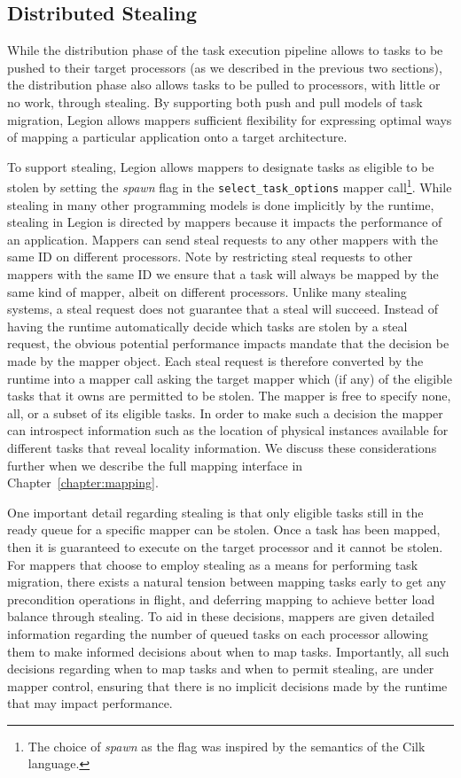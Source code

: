 \subsection{Distributed Stealing}
\label{subsec:stealdist}
While the distribution phase of the task
execution pipeline allows to tasks to be
pushed to their target processors (as 
we described in the previous two sections),
the distribution phase also allows tasks 
to be pulled to processors, with little or
no work, through stealing. By supporting both
push and pull models of task migration, 
Legion allows mappers sufficient flexibility
for expressing optimal ways of mapping a
particular application onto a target
architecture.

To support stealing, Legion allows mappers
to designate tasks as eligible to be
stolen by setting the {\em spawn} flag
in the {\tt select\_task\_options} mapper
call\footnote{The choice of {\em spawn} as the flag
was inspired by the semantics of the Cilk
language\cite{Cilk98}.}. While stealing in many
other programming models is done implicitly by
the runtime, stealing in Legion is directed by 
mappers because it impacts the performance 
of an application. Mappers can send steal requests 
to  any other mappers with the same ID on
different processors. Note by restricting steal
requests to other mappers with the same ID
we ensure that a task will always be mapped
by the same kind of mapper, albeit on different
processors. Unlike many stealing systems,
a steal request does not guarantee that a
steal will succeed.  Instead of having the
runtime automatically decide which tasks
are stolen by a steal request, the obvious
potential performance impacts mandate that
the decision be made by the mapper object.
Each steal request is therefore converted
by the runtime into a mapper call asking
the target mapper which (if any) of the 
eligible tasks that it owns are permitted
to be stolen. The mapper is free to specify
none, all, or a subset of its eligible tasks.
In order to make such a decision the mapper
can introspect information such as the location
of physical instances available for different
tasks that reveal locality information. We
discuss these considerations further
when we describe the full mapping interface
in Chapter~\ref{chapter:mapping}.

One important detail regarding stealing is
that only eligible tasks still in the
ready queue for a specific mapper can be
stolen.  Once a task has been mapped, then
it is guaranteed to execute on the target
processor and it cannot be stolen.  For mappers
that choose to employ stealing as a means
for performing task migration, there exists
a natural tension between mapping tasks
early to get any precondition operations in 
flight, and deferring mapping to achieve better 
load balance through stealing. To aid
in these decisions, mappers are given detailed
information regarding the number of queued
tasks on each processor allowing them to
make informed decisions about when to map
tasks. Importantly, all such decisions regarding
when to map tasks and when to permit stealing,
are under mapper control, ensuring that there
is no implicit decisions made by the runtime
that may impact performance.

